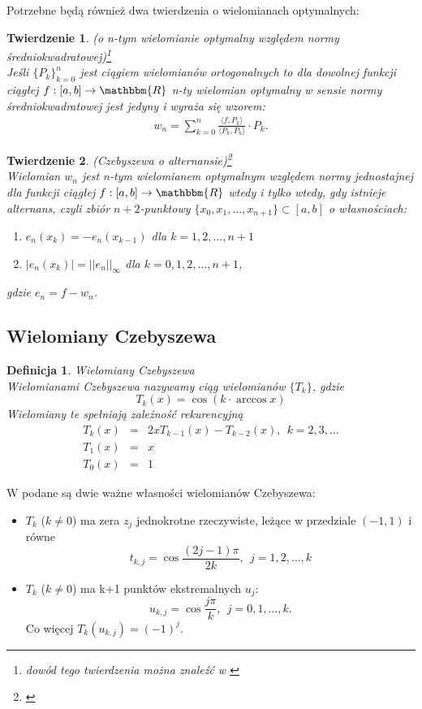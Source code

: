 \documentclass[12pt,wide]{mwart}
\newtheorem{tw}{Twierdzenie}
\newtheorem{defin}{Definicja}
\begin{document}
Potrzebne będą również dwa twierdzenia o wielomianach optymalnych:\\
\begin{tw}{(o n-tym wielomianie optymalny względem normy średniokwadratowej)\footnote{dowód tego twierdzenia można znaleźć w \cite[strona 91]{Bj}}}\\
Jeśli $\{P_k\}_{k=0}^n$ jest ciągiem wielomianów ortogonalnych to dla dowolnej funkcji ciągłej $f:[a,b] \rightarrow \mathbbm{R}$ n-ty wielomian optymalny w sensie normy średniokwadratowej jest jedyny i wyraża się wzorem:
\begin{eqnarray*}
w_n = \sum_{k=0}^n \frac{\langle f,P_k \rangle}{\langle P_k,P_k \rangle} \cdot P_k.
\end{eqnarray*}
\end{tw}

\begin{tw}{(Czebyszewa o alternansie){\footnote{\cite[strona 122]{Bj}}}}\\
Wielomian $w_n$ jest n-tym wielomianem optymalnym względem normy jednostajnej dla funkcji ciągłej $f:[a,b] \rightarrow \mathbbm{R}$ wtedy i tylko wtedy, gdy istnieje alternans, czyli zbiór $n+2$-punktowy $\{x_0,x_1,\ldots,x_{n+1}\} \subset [a,b]$ o własnościach: 
\begin{enumerate}
\item $e_n(x_k) = -e_n(x_{k-1})$ dla $k = 1,2,\ldots,n+1$
\item $|e_n(x_k)| = ||e_n||_\infty$ dla $k = 0,1,2,\ldots,n+1$,
\end{enumerate}
gdzie $e_n = f - w_n$.
\end{tw}

\subsection{Wielomiany Czebyszewa}
\begin{defin}{Wielomiany Czebyszewa}\\
Wielomianami Czebyszewa nazywamy ciąg wielomianów $\{T_k\}$, gdzie 
$$
	T_k(x) = \cos(k \cdot \arccos x)
$$
Wielomiany te spełniają zależność rekurencyjną
\begin{eqnarray*}
T_k(x) &=& 2xT_{k-1}(x) - T_{k-2}(x), \ \ k = 2,3,\ldots \\
T_1(x) &=& x\\
T_0(x) &=& 1
\end{eqnarray*}
\end{defin}

W \cite[strony 98-99]{JMJ} podane są dwie ważne własności wielomianów Czebyszewa:
\begin{itemize}
\item $T_k$ ($k \neq 0$) ma zera $z_j$ jednokrotne rzeczywiste, leżące w przedziale $(-1,1)$ i równe
$$
	t_{k,j} = \cos\frac{(2j-1)\pi}{2k}, \ \  j = 1,2,\ldots,k
$$
\item $T_k$ ($k \neq 0$) ma k+1 punktów ekstremalnych $u_j$:
$$
u_{k,j} = \cos \frac{j\pi}{k}, \ \ j = 0,1,\ldots,k.
$$
Co więcej $T_k(u_{k,j}) = (-1)^j$.
\end{itemize}
\end{document}
